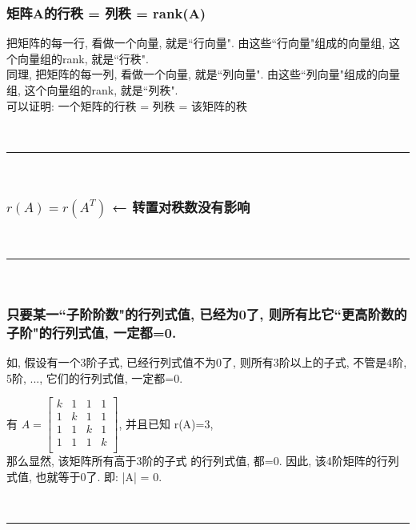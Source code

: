 \documentclass[UTF8]{ctexart}
\begin{document}
\subsubsection{矩阵A的行秩 = 列秩 = rank(A)}

把矩阵的每一行, 看做一个向量, 就是``行向量". 由这些``行向量"组成的向量组, 这个向量组的rank, 就是``行秩".\\
同理, 把矩阵的每一列, 看做一个向量, 就是``列向量". 由这些``列向量"组成的向量组, 这个向量组的rank, 就是``列秩".\\

可以证明: 一个矩阵的行秩 = 列秩 = 该矩阵的秩


~\\
\hrule
~\\



\subsubsection{$r(A) = r(A^T) $ ← 转置对秩数没有影响}


~\\
\hrule
~\\


\subsubsection{只要某一``子阶阶数"的行列式值, 已经为0了, 则所有比它``更高阶数的子阶"的行列式值, 一定都=0.}

\begin{myEnvSample}
如, 假设有一个3阶子式, 已经行列式值不为0了, 则所有3阶以上的子式, 不管是4阶, 5阶, ..., 它们的行列式值, 一定都=0.
\end{myEnvSample}


\begin{myEnvSample}
有 
$
	A=\left[ \begin{matrix}
		k&		1&		1&		1\\
		1&		k&		1&		1\\
		1&		1&		k&		1\\
		1&		1&		1&		k\\
	\end{matrix} \right]
$, 并且已知 r(A)=3, \\
那么显然, 该矩阵所有高于3阶的子式 的行列式值, 都=0. 因此, 该4阶矩阵的行列式值, 也就等于0了. 即:  |A| = 0.
\end{myEnvSample}


~\\
\hrule
~\\
\end{document}
